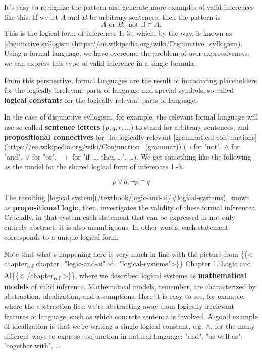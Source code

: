 \documentclass[11pt]{article}
\begin{document}
It's easy to recognize the pattern and generate more examples of valid
inferences like this. If we let \(A\) and \(B\) be arbitrary sentences, then the
pattern is $$A\text{ or }B, \text{ not B}\vDash A.$$
This is the logical form of inferences 1.-3., which, by the way, is known as
[disjunctive syllogism](\url{https://en.wikipedia.org/wiki/Disjunctive\_syllogism}). Using a formal language, we have overcome the problem of over-expressiveness: we can express this type of valid inference in a single formula.

From this perspective, formal languages are the result of introducing
\uline{placeholders} for the logically irrelevant parts of language and special
symbols, so-called \textbf{\textbf{logical constants}} for the logically relevant parts of
language.

In the case of disjunctive syllogism, for example, the relevant formal language
will use so-called \textbf{\textbf{sentence letters}} (\(p,q,r,\dots\)) to stand for arbitrary 
sentences, and \textbf{\textbf{propositional connectives}} for the logically relevant
[grammatical conjunctions](\url{https://en.wikipedia.org/wiki/Conjunction\_(grammar)})
(\(\neg\) for "not", \(\land\) for "and", \(\lor\) for "or", \(\rightarrow\) for "if \ldots{}, then
\ldots{}", \ldots{}). We get something like the following as the model for the shared logical form of inferences 1.-3. 

$$p\lor q,\neg p\vDash q$$ 

The resulting [logical
system](/textbook/logic-and-ai/\#logical-systems), known as \textbf{\textbf{propositional
logic}}, then, investigates the validity of these \uline{formal} inferences. Crucially, in that system each statement that can be expressed in not only entirely abstract, it is also unambiguous. In other words, each statement corresponds to a unique logical form.

Note that what's happening here is very much in line with the picture from \{\{< chapter\textsubscript{ref} chapter="logic-and-ai" id="logical-systems">\}\}
Chapter 1. Logic and AI\{\{< /chapter\textsubscript{ref} >\}\}, where we described logical systems
as \textbf{mathematical models} of valid inference. Mathematical models, remember, are
characterized by abstraction, idealization, and assumptions. Here it is easy to
see, for example, where the abstraction lies: we're abstracting away from
logically irrelevant features of language, such as which concrete sentence is
involved. A good example of idealization is that we're writing a single logical
constant, e.g. \(\land\), for the many different ways to express conjunction in
natural language: "and", "as well as", "together with", \ldots{}
\end{document}
